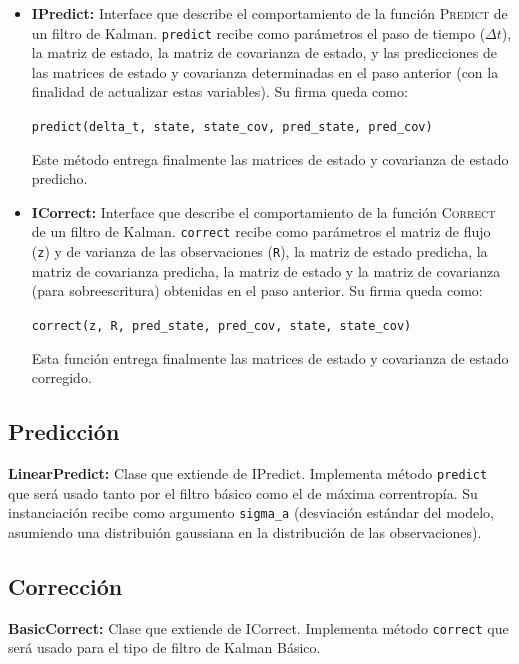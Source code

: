\begin{itemize}
\item \textbf{IPredict:} Interface que describe el comportamiento de la funci\'on \textsc{Predict} de un filtro de Kalman. \texttt{predict} recibe como par\'ametros el paso de tiempo ($\Delta t$), la matriz de estado, la matriz de covarianza de estado, y las predicciones de las matrices de estado y covarianza determinadas en el paso anterior (con la finalidad de actualizar estas variables). Su firma queda como:
\begin{center}
\texttt{predict(delta\_t, state, state\_cov, pred\_state, pred\_cov)}
\end{center}
Este m\'etodo entrega finalmente las matrices de estado y covarianza de estado predicho.
\bigskip

\item \textbf{ICorrect:} Interface que describe el comportamiento de la funci\'on \textsc{Correct} de un filtro de Kalman. \texttt{correct} recibe como par\'ametros el matriz de flujo (\texttt{z}) y de varianza de las observaciones (\texttt{R}), la matriz de estado predicha, la matriz de covarianza predicha, la matriz de estado y la matriz de covarianza (para sobreescritura) obtenidas en el paso anterior. Su firma queda como:
\begin{center}
\texttt{correct(z, R, pred\_state, pred\_cov, state, state\_cov)}
\end{center}
\bigskip
Esta funci\'on entrega finalmente las matrices de estado y covarianza de estado corregido.

\end{itemize}

\subsection{Predicci\'on}
\textbf{LinearPredict:} Clase que extiende de IPredict. Implementa m\'etodo \texttt{predict} que ser\'a usado tanto por el filtro b\'asico como el de m\'axima correntrop\'ia. Su instanciaci\'on recibe como argumento \texttt{sigma\_a} (desviaci\'on est\'andar del modelo, asumiendo una distribui\'on gaussiana en la distribuci\'on de las observaciones).
\bigskip


\subsection{Correcci\'on}
\textbf{BasicCorrect:} Clase que extiende de ICorrect. Implementa m\'etodo \texttt{correct} que ser\'a usado para el tipo de filtro de Kalman B\'asico.
\bigskip

